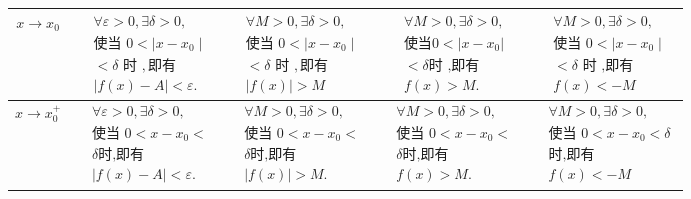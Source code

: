 \documentclass[12pt, a4paper, oneside, UTF8]{ctexbook}  %
\begin{document}
\begin{sloppypar}
\begin{center}
\begin{supertabular}{|c|c|c|c|c|}
            $x \to x_0$       & $\begin{aligned}&\forall\varepsilon>0,\exists\delta>0, \\&\text{使当 }0<\mid x-x_0\mid  \\&<\delta\text{ 时 },\text{即有} \\&|f(x)-A|<\varepsilon.\end{aligned}$ & $\begin{aligned}&\forall M>0,\exists\delta>0, \\&\text{使当 }0<\mid x-x_{0}\mid  \\&<\delta\text{ 时 },\text{即有}\\& |f(x)|>M\end{aligned}$ & $\begin{aligned}&\forall M>0,\exists\delta>0, \\&\text{使当} 0<|x-x_0| \\ &<\delta \text{时 ,即有} \\ &f(x)>M.\end{aligned}$      & $\begin{aligned}&\forall M>0,\exists\delta>0, \\&\text{使当 }0<\mid x-x_{0}\mid  \\&<\delta\text{ 时 ,即有}\\& f(x) <-M\end{aligned}$ \\ \hline
            $x \to x_0^+$     & $\begin{aligned}&\forall\varepsilon>0,\exists\delta>0, \\&\text{使当 }0<x-x_{0}< \\&\delta \text{时,即有}\\&|f(x)-A|<\varepsilon.\end{aligned}$                  & $\begin{aligned}&\forall M>0,\exists\delta>0, \\&\text{使当 }0<x-x_{0}< \\&\delta \text{时,即有} \\&|f(x)|>M.\end{aligned}$                  & $\begin{aligned}&\forall M>0,\exists\delta>0, \\&\text{使当 }0<x-x_{0}< \\&\delta \text{时,即有} \\&f(x)>M.\end{aligned}$         & $\begin{aligned}&\forall M>0,\exists\delta>0, \\&\text{使当 }0<x-x_{0}<\delta  \\&\text{时,即有} \\& f(x) <-M\end{aligned} $          \\ \hline

\end{supertabular}
\end{center}
\end{sloppypar}
\end{document}
